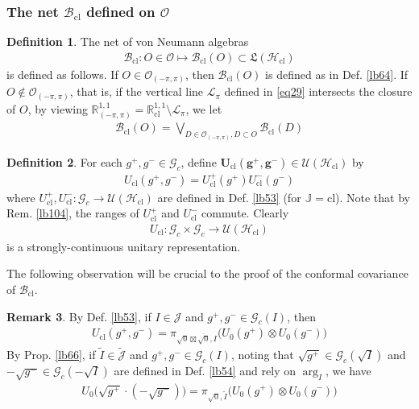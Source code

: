 \documentclass[11pt,b5paper,notitlepage]{article}
\theoremstyle{definition}
\newtheorem{df}{Definition}[section]
\newtheorem{rem}[df]{Remark}
\theoremstyle{plain}
\newcommand{\fk}{\mathfrak}
\newcommand{\wtd}{\widetilde}
\newcommand{\ovl}{\overline}
\newcommand{\Jtd}{\widetilde{\mathcal J}}
\newcommand{\Gc}{\mathscr G_c}
\newcommand{\cl}{\mathrm{cl}}
\newcommand{\Jbb}{\mathbb J}
\newcommand{\MJ}{\mathcal J}
\newcommand{\MU}{\mathcal U}
\newcommand{\MO}{\mathcal O}
\newcommand{\sqz}{{\sqrt 0}}
\newcommand{\MHcl}{\mathcal H_{\mathrm{cl}}}
\newcommand{\Rcl}{\mathbb R^{1,1}_{\mathrm{cl}}}
\newcommand{\Rpp}{\mathbb R^{1,1}_{(-\pi,\pi)}}
\newcommand{\Bcl}{\mathcal B_{\mathrm{cl}}}
\newcommand{\Opp}{\mathcal O_{(-\pi,\pi)}}
\newcommand{\Hcl}{\mathcal H_{\mathrm{cl}}}
\newcommand{\SL}{\mathscr L}
\newcommand{\Ucl}{U_{\mathrm{cl}}}
\numberwithin{equation}{section}
\begin{document}
\subsubsection{The net $\Bcl$ defined on $\MO$}


\begin{df}\label{lb74}
The net of von Neumann algebras
\begin{align*}
\pmb{\Bcl}:O\in\MO\mapsto \Bcl(O)\subset\fk L(\Hcl)
\end{align*}
is defined as follows. If $O\in\Opp$, then $\Bcl(O)$ is defined as in Def. \ref{lb64}. If $O\notin\Opp$, that is, if the vertical line $\SL_\pi$ defined in \eqref{eq29} intersects the closure of $O$, by viewing $\Rpp=\Rcl\setminus\SL_\pi$, we let
\begin{align}\label{eq31}
\Bcl(O)=\bigvee_{D\in\Opp,D\subset O}\Bcl(D)
\end{align}
\end{df}

\begin{df}\label{lb134}
For each $g^+,g^-\in\Gc$, define $\pmb{\Ucl(g^+,g^-)}\in\MU(\Hcl)$ by
\begin{align*}
\Ucl(g^+,g^-)=\Ucl^+(g^+)\Ucl^-(g^-)
\end{align*}
where $\Ucl^+,\Ucl^-:\Gc\rightarrow\MU(\MHcl)$ are defined in Def. \ref{lb53} (for $\Jbb=\cl$). Note that by Rem. \ref{lb104}, the ranges of $\Ucl^+$ and $\Ucl^-$ commute.  Clearly
\begin{align*}
\Ucl:\Gc\times\Gc\rightarrow\MU(\MHcl)
\end{align*}
is a strongly-continuous unitary representation.
\end{df}




The following observation will be crucial to the proof of the conformal covariance of $\Bcl$.

\begin{rem}\label{lb67}
By Def. \ref{lb53}, if $I\in\MJ$ and $g^+,g^-\in\Gc(I)$, then
\begin{align}\label{eq55}
\Ucl(g^+,g^-)=\pi_{\sqz\boxtimes\ovl\sqz,I}\big(U_0(g^+)\otimes U_0(g^-)\big)
\end{align}
By Prop. \ref{lb66}, if $\wtd I\in\Jtd$ and $g^+,g^-\in\Gc(I)$, noting that $\sqrt{g^+}\in\Gc(\sqrt I)$ and $-\sqrt{g^-}\in\Gc(-\sqrt I)$ are defined in Def. \ref{lb54} and rely on $\arg_I$, we have
\begin{align}\label{eq54}
U_0\big(\sqrt{g^+}\cdot(-\sqrt{g^-})\big)=\pi_{\sqz,\wtd I}\big(U_0(g^+)\otimes U_0(g^-)\big)
\end{align}
\end{rem}
\end{document}
